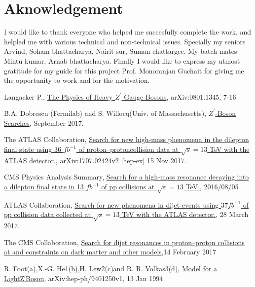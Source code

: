 \documentclass[12pt,a4paper]{article}		%
\begin{document}
\newpage
\section{Aknowledgement}
I would like to thank everyone who helped me succesfully complete the work, and helpled me with various technical and non-technical issues. Specially my seniors Arvind, Soham bhattacharya, Nairit sur, Suman chattargee. My batch mates Mintu kumar, Arnab bhattacharya. Finally I would like to express my utmost gratitude for my guide for this project Prof. Monoranjan Guchait for giving me the opportunity to work and for the motivation.          
	 
	\newpage 


\begin{thebibliography}{}
	 Langacker P., \href{https://arxiv.org/abs/0801.1345v3}{The Physics of Heavy $Z^\prime$ Gauge Bosons}, arXiv:0801.1345, 7-16
	
	  B.A. Dobrescu (Fermilab) and S. Willocq(Univ. of Massachusetts), \href{http://pdg.lbl.gov/2017/reviews/rpp2017-rev-zprime-searches.pdf}{$Z^\prime$-Boson Searches}, September 2017.
	
	 The ATLAS Collaboration, \href{https://arxiv.org/pdf/1707.02424.pdf}{Search for new high-mass phenomena in the dilepton final state using 36 $fb^{−1}$ of proton–protoncollision data at $\sqrt{s}=13$ TeV with the ATLAS detector.}, arXiv:1707.02424v2  [hep-ex]  15 Nov 2017.
	
	 CMS Physics Analysis Summary, \href{http://inspirehep.net/record/1479666/files/EXO-16-031-pas.pdf?version=1}{Search for a high-mass resonance decaying into a dilepton final state in 13 $fb^{−1}$ of pp collisions at $\sqrt{s}=13$ TeV.}, 2016/08/05
	  
	 ATLAS Collaboration, \href{https://journals.aps.org/prd/pdf/10.1103/PhysRevD.96.052004 }{Search for new phenomena in dijet events using $37fb^{-1}$ of pp collision data collected at $\sqrt{s}=13$ TeV with the ATLAS detector.}, 28 March 2017.  
	
	 The CMS Collaboration, \href{https://www.sciencedirect.com/science/article/pii/S0370269317301028?via%3Dihub}{Search for dijet resonances in proton–proton collisions at and constraints on dark matter and other models},14 February 2017 
		
	 R. Foot(a),X.-G. He1(b),H. Lew2(c)and R. R. Volkas3(d), \href{https://arxiv.org/pdf/hep-ph/9401250.pdf}{Model for a LightZ′Boson}, arXiv:hep-ph/9401250v1, 13 Jan 1994	
	

\end{thebibliography}
\end{document}
